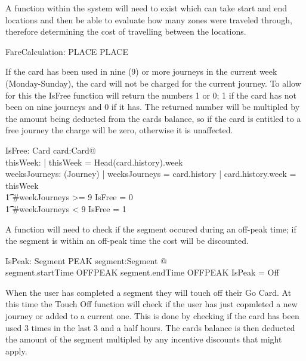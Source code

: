 \documentclass{article}
\begin{document}
A function within the system will need to exist which can take start and end
locations and then be able to evaluate how many zones were
traveled through, therefore determining the cost of travelling between the
locations.

\begin{axdef}
FareCalculation: PLACE \cross PLACE \fun \nat
\end{axdef}

If the card has been used in nine (9) or more journeys in the current week (Monday-Sunday), the card will not be charged
for the current journey. To allow for this the IsFree function will return the numbers 1 or 0; 1 if
the card has not been on nine journeys and 0 if it has. The returned number will be multipled by the amount being deducted from 
the cards balance, so if the card is entitled to a free journey the charge will be zero, otherwise it is unaffected.

\begin{axdef}
IsFree: Card \fun \nat
\where
\forall card:Card@\\
\exists thisWeek: \nat | thisWeek = Head(card.history).week \land\\
\exists weeksJourneys: \seq (Journey) | weeksJourneys = card.history | card.history.week = thisWeek\\
\t1 \#weekJourneys >= 9 \implies IsFree = 0 \\
\t1 \#weekJourneys < 9 \implies IsFree = 1 
\end{axdef}

A function will need to check if the segment occured during an off-peak time; if the segment is within an off-peak time
the cost will be discounted.

\begin{axdef}
IsPeak: Segment \fun PEAK
\where
\forall segment:Segment @\\
segment.startTime \in OFFPEAK \land segment.endTime \in OFFPEAK \implies IsPeak
= Off
\end{axdef}

When the user has completed a segment they will touch off their Go Card. At this time the Touch Off function will check if 
the user has just copmleted a new journey or added to a current one. This is done by checking if the card has been used 3 
times in the last 3 and a half hours. The cards balance is then deducted the
amount of the segment multipled by any incentive discounts that might apply.
\end{document}
